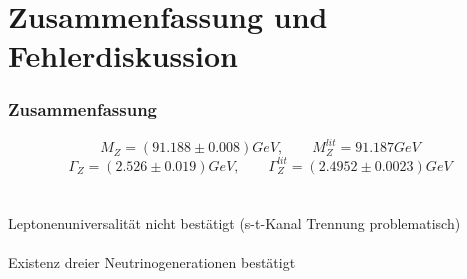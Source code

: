 \section{Zusammenfassung und Fehlerdiskussion}
\begin{frame}
	\frametitle{Zusammenfassung}
	\begin{equation*}
		M_Z=(91.188\pm0.008)\unit{GeV},\qquad M_Z^{lit}=91.187\unit{GeV}
	\end{equation*}
	\mbox{}
	\begin{equation*}
		\Gamma_Z=(2.526\pm0.019)\unit{GeV},\qquad \Gamma_Z^{lit}=(2.4952\pm0.0023)\unit{GeV}
	\end{equation*}\\
	\hfill\\
	Leptonenuniversalität nicht bestätigt (s-t-Kanal Trennung problematisch)\\
	\hfill\\
	Existenz dreier Neutrinogenerationen bestätigt
\end{frame}